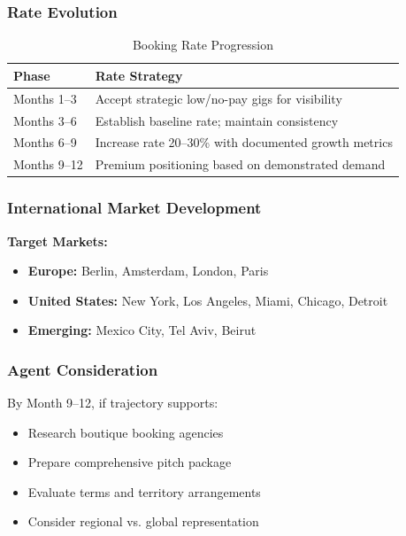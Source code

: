 \documentclass[11pt,a4paper]{article}
\begin{document}
\subsubsection{Rate Evolution}

\begin{table}[h!]
\centering
\renewcommand{\arraystretch}{1.3}
\begin{tabularx}{\textwidth}{l X}
\toprule
\rowcolor{amaraprimary}
\textcolor{amaracream}{\textbf{Phase}} & \textcolor{amaracream}{\textbf{Rate Strategy}} \\
\midrule
Months 1--3 & Accept strategic low/no-pay gigs for visibility \\
Months 3--6 & Establish baseline rate; maintain consistency \\
Months 6--9 & Increase rate 20--30\% with documented growth metrics \\
Months 9--12 & Premium positioning based on demonstrated demand \\
\bottomrule
\end{tabularx}
\caption{Booking Rate Progression}
\end{table}

\subsubsection{International Market Development}

\noindent\textbf{Target Markets:}
\begin{itemize}[leftmargin=*]
    \item \textbf{Europe:} Berlin, Amsterdam, London, Paris
    \item \textbf{United States:} New York, Los Angeles, Miami, Chicago, Detroit
    \item \textbf{Emerging:}  Mexico City, Tel Aviv, Beirut
\end{itemize}

\subsubsection{Agent Consideration}
By Month 9--12, if trajectory supports:
\begin{itemize}[leftmargin=*]
    \item Research boutique booking agencies
    \item Prepare comprehensive pitch package
    \item Evaluate terms and territory arrangements
    \item Consider regional vs. global representation
\end{itemize}
\end{document}
